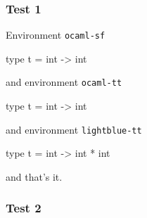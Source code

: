 \documentclass[compress]{beamer}
\begin{document}
\begin{frame}\frametitle{Test 1}

Environment \texttt{ocaml-sf}
\begin{ocaml}
  type t = int -> int
\end{ocaml}
and environment \texttt{ocaml-tt}
\begin{ocaml-tt}
  type t = int -> int
\end{ocaml-tt}
and environment \texttt{lightblue-tt}
\begin{lightblue-tt}
  type t = int -> int * int
\end{lightblue-tt}
and that's it.
\end{frame}

\begin{frame}\frametitle{Test 2}
\end{frame}
\end{document}
